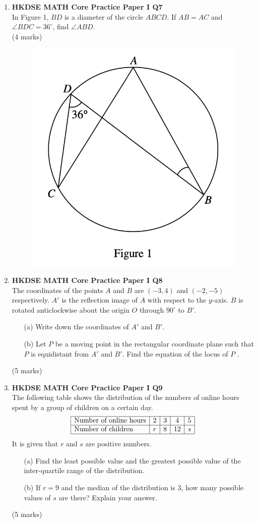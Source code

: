 \documentclass[12pt]{article}
\begin{document}
\begin{enumerate}
	\item \textbf{HKDSE MATH Core Practice Paper I Q7}\\
	In Figure 1, $BD$ is a diameter of the circle $ABCD$. If $AB = AC$ and $\angle BDC = 36^\circ$, find $\angle ABD$. \\(4 marks)
	\begin{figure}[H]
		\centering
		\includegraphics[width = .5\linewidth]{PPFigure1.1}
	\end{figure}

	\item \textbf{HKDSE MATH Core Practice Paper I Q8}\\
	The coordinates of the points $A$ and $B$ are $(-3,4)$ and $(-2, -5)$ respectively. $A'$ is the reflection image of $A$ with respect to the $y$-axis. $B$ is rotated anticlockwise about the origin $O$ through $90^\circ$ to $B'$.
	\begin{enumerate}
		\item[(a)] Write down the coordinates of $A'$ and $B'$.
		\item[(b)] Let $P$ be a moving point in the rectangular coordinate plane such that $P$ is equidistant from $A'$ and $B'$. Find the equation of the locus of $P$ .
	\end{enumerate}
	(5 marks)

	\item \textbf{HKDSE MATH Core Practice Paper I Q9}\\
	The following table shows the distribution of the numbers of online hours spent by a group of children
	on a certain day.
	$$\begin{array}{|l|c|c|c|c|}
		\hline
		\text{Number of online hours} & 2 & 3 & 4 & 5 \\
		\hline
		\text{Number of children} & r & 8 & 12 & s \\		
		\hline
	\end{array}$$
	It is given that $r$ and $s$ are positive numbers.
	\begin{enumerate}
		\item[(a)] Find the least possible value and the greatest possible value of the inter-quartile range of the distribution.
		\item[(b)] If $r = 9$ and the median of the distribution is 3, how many possible values of $s$ are there? Explain your answer.		
	\end{enumerate}
	(5 marks)


\end{enumerate}
\end{document}
